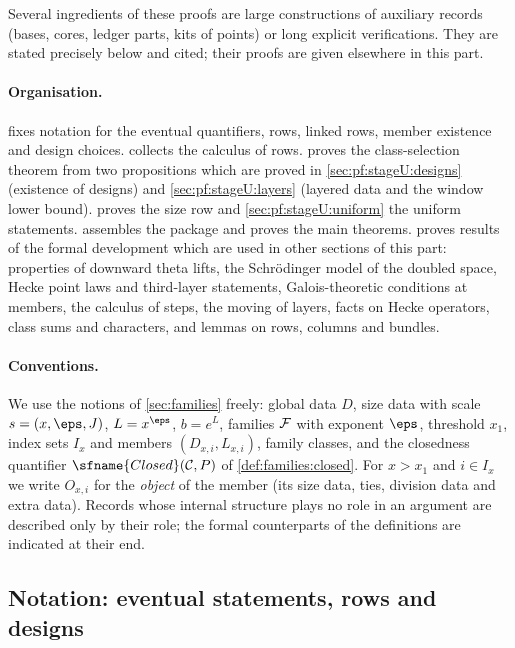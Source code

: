 Several ingredients of these proofs are large constructions of auxiliary records (bases, cores, ledger parts, kits of
points) or long explicit verifications. They are stated precisely below and cited; their proofs are given elsewhere in
this part.

\paragraph{Organisation.}  fixes notation for the eventual quantifiers, rows, linked rows,
member existence and design choices.  collects the calculus of rows.
 proves the class-selection theorem from two propositions which are proved in
\cref{sec:pf:stageU:designs} (existence of designs) and \cref{sec:pf:stageU:layers} (layered data and the window lower
bound).  proves the size row and \cref{sec:pf:stageU:uniform} the uniform statements.
 assembles the package and proves the main theorems.  proves results
of the formal development which are used in other sections of this part: properties of downward theta lifts, the Schr\"odinger
model of the doubled space, Hecke point laws and third-layer statements, Galois-theoretic conditions at members, the calculus of
steps, the moving of layers, facts on Hecke operators, class sums and characters, and lemmas on rows, columns and bundles.

\paragraph{Conventions.} We use the notions of \cref{sec:families} freely: global data $D$, size data with scale
$s=(x,\eps,J)$, $L=x^{\eps}$, $b=e^{L}$, families $\mathcal{F}$ with exponent $\eps$, threshold $x_1$, index sets $I_x$ and
members $(D_{x,i},L_{x,i})$, family classes, and the closedness quantifier $\sfname{Closed}(\stageUC,P)$ of
\cref{def:families:closed}. For $x>x_1$ and $i\in I_x$ we write $O_{x,i}$ for the \emph{object} of the member (its size
data, ties, division data and extra data). Records whose internal structure plays no role in an argument are
described only by their role; the formal counterparts of the definitions are indicated at their end.

\subsection{Notation: eventual statements, rows and designs}\label{sec:pf:stageU:vocab}

